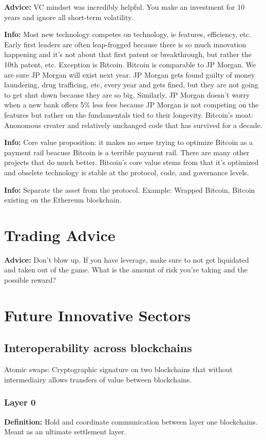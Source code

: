 \documentclass[10pt,twocolumn]{article}
\begin{document}
{\bf Advice:} VC mindset was incredibly helpful. You make an investment for 10
years and ignore all short-term volatility. 

{\bf Info:} Most new technology competes on technology, ie features, efficiency,
etc. Early first leaders are often leap-frogged because there is so much
innovation happening and it's not about that first patent or breakthrough, but
rather the 10th patent, etc. Exception is Bitcoin. Bitcoin is comparable to JP
Morgan. We are sure JP Morgan will exist next year. JP Morgan gets found guilty
of money laundering, drug trafficing, etc, every year and gets fined, but they
are not going to get shut down because they are so big. Similarly, JP Morgan
doesn't worry when a new bank offers 5\% less fees because JP Morgan is not
competing on the features but rather on the fundamentals tied to their
longevity. Bitcoin's moat: Anonomous creater and relatively unchanged code that
has survived for a decade. 

{\bf Info:} Core value proposition: it makes no sense trying to optimize Bitcoin
as a payment rail beacuse Bitcoin is a terrible payment rail. There are many
other projects that do much better. Bitcoin's core value stems from that it's
optimized and obselete technology is stable at the protocol, code, and
governance levels. 

{\bf Info:} Separate the asset from the protocol. Example: Wrapped Bitcoin,
Bitcoin existing on the Ethereum blockchain. 

\section{Trading Advice}

{\bf Advice:} Don't blow up. If you have leverage, make sure to not get
liquidated and taken out of the game. What is the amount of risk you're taking
and the possible reward?

\section{Future Innovative Sectors}
\subsection{Interoperability across blockchains}
Atomic swaps: Cryptographic signature on two blockchains that without
intermediairy allows transfers of value between blockchains. 

\subsubsection{Layer 0}
{\bf Definition:} Hold and coordinate communication between layer one
blockchains. Meant as an ultimate settlement layer. 
\end{document}
